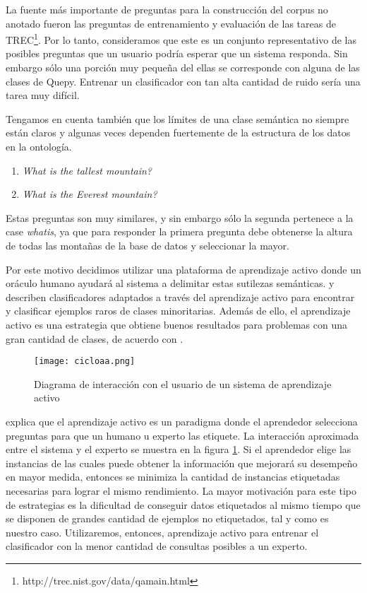 La fuente más importante de preguntas para la construcción del corpus no anotado fueron las preguntas de entrenamiento y evaluación de las tareas de TREC\footnote  {http://trec.nist.gov/data/qamain.html}. Por lo tanto, consideramos que este es un conjunto representativo de las posibles preguntas que un usuario podría esperar que un sistema responda. Sin embargo sólo una porción muy pequeña del ellas se corresponde con alguna de las clases de Quepy. Entrenar un clasificador con tan alta cantidad de ruido sería una tarea muy difícil.

Tengamos en cuenta también que los límites de una clase semántica no siempre están claros y algunas veces dependen fuertemente de la estructura de los datos en la ontología.

\begin{example}\label{preguntas-similares}\hfill
    \begin{enumerate}
    \item \textit{What is the tallest mountain?}
    \item \textit{What is the Everest mountain?}
    \end{enumerate}
\end{example}

Estas preguntas son muy similares, y sin embargo sólo la segunda pertenece a la case \textit{whatis}, ya que para responder la primera pregunta debe obtenerse la altura de todas las montañas de la base de datos y seleccionar la mayor.

Por este motivo decidimos utilizar una plataforma de aprendizaje activo donde un oráculo humano ayudará al sistema a delimitar estas sutilezas semánticas. \citet{rare-classes-holpedales} y \citet{AL-imbalanced-Ertekin} describen clasificadores adaptados a través del aprendizaje activo para encontrar y clasificar ejemplos raros de clases minoritarias. Además de ello, el aprendizaje activo es una estrategia que obtiene buenos resultados para problemas con una gran cantidad de clases, de acuerdo con \citet{al-multiclass-jain}.

\begin{figure}[h]
\caption{Diagrama de interacción con el usuario de un sistema de aprendizaje activo}\label{cicloaa}
\texttt{[image: cicloaa.png]}
\centering
\end{figure}

\citet{settles_active_learning_survey} explica que el aprendizaje activo es un paradigma donde el aprendedor selecciona preguntas para que un humano u experto las etiquete. La interacción aproximada entre el sistema y el experto se muestra en la figura \ref{cicloaa}. Si el aprendedor elige las instancias de las cuales puede obtener la información que mejorará su desempeño en mayor medida, entonces se minimiza la cantidad de instancias etiquetadas necesarias para lograr el mismo rendimiento. La mayor motivación para este tipo de estrategias es la dificultad de conseguir datos etiquetados al mismo tiempo que se disponen de grandes cantidad de ejemplos no etiquetados, tal y como es nuestro caso. Utilizaremos, entonces, aprendizaje activo para entrenar el clasificador con la menor cantidad de consultas posibles a un experto.


